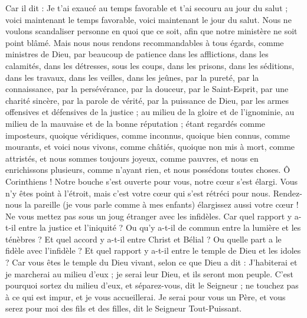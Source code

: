 \begin{multicols}{2}
Car il dit : Je t'ai exaucé au temps favorable et t'ai secouru au jour du salut ; voici maintenant le temps favorable, voici maintenant le jour du salut.
Nous ne voulons scandaliser personne en quoi que ce soit, afin que notre ministère ne soit point blâmé.
Mais nous nous rendons recommandables à tous égards, comme ministres de Dieu, par beaucoup de patience dans les afflictions, dans les calamités, dans les détresses,
sous les coups, dans les prisons, dans les séditions, dans les travaux, dans les veilles, dans les jeûnes,
par la pureté, par la connaissance, par la persévérance, par la douceur, par le Saint-Esprit, par une charité sincère,
par la parole de vérité, par la puissance de Dieu, par les armes offensives et défensives de la justice ;
au milieu de la gloire et de l'ignominie, au milieu de la mauvaise et de la bonne réputation ; étant regardés comme imposteurs, quoique véridiques,
comme inconnus, quoique bien connus, comme mourants, et voici nous vivons, comme châtiés, quoique non mis à mort,
comme attristés, et nous sommes toujours joyeux, comme pauvres, et nous en enrichissons plusieurs, comme n'ayant rien, et nous possédons toutes choses.
Ô Corinthiens ! Notre bouche s’est ouverte pour vous, notre cœur s'est élargi.
Vous n’y êtes point à l'étroit, mais c’est votre cœur qui s’est rétréci pour nous.
Rendez-nous la pareille (je vous parle comme à mes enfants) élargissez aussi votre cœur !
Ne vous mettez pas sous un joug étranger avec les infidèles. Car quel rapport y a-t-il entre la justice et l'iniquité ? Ou qu’y a-t-il de commun entre la lumière et les ténèbres ?
Et quel accord y a-t-il entre Christ et Bélial ? Ou quelle part a le fidèle avec l'infidèle ?
Et quel rapport y a-t-il entre le temple de Dieu et les idoles ? Car vous êtes le temple du Dieu vivant, selon ce que Dieu a dit : J'habiterai et je marcherai au milieu d'eux ; je serai leur Dieu, et ils seront mon peuple.
C'est pourquoi sortez du milieu d'eux, et séparez-vous, dit le Seigneur ; ne touchez pas à ce qui est impur, et je vous accueillerai.
Je serai pour vous un Père, et vous serez pour moi des fils et des filles, dit le Seigneur Tout-Puissant.

\end{multicols}
